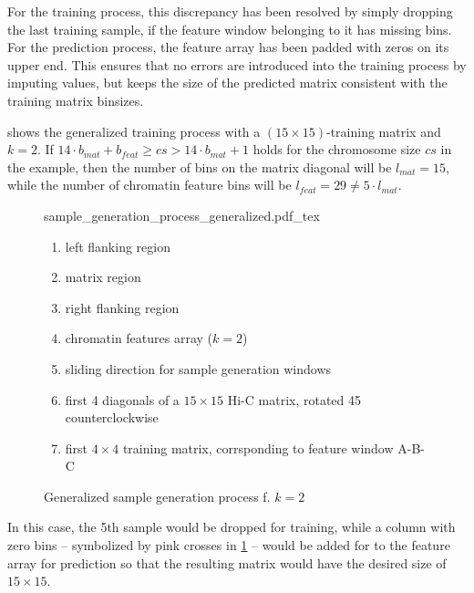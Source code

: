 For the training process, this discrepancy has been resolved by simply dropping the last training sample, 
if the feature window belonging to it has missing bins.
For the prediction process, the feature array has been padded with zeros on its upper end.
This ensures that no errors are introduced into the training process by imputing values,
but keeps the size of the predicted matrix consistent with the training
matrix binsizes.

 shows the generalized training process with a $(15\times15)$-training matrix and $k=2$. 
If $14\cdot b_{mat} + b_{feat} \geq cs > 14\cdot b_{mat} + 1$ holds for the chromosome size $cs$ in the example,
then the number of bins on the matrix diagonal will be $l_{mat}=15$, while the number of chromatin feature bins will be $l_{feat}=29 \not = 5 \cdot l_{mat}$.
\begin{figure}
 \begin{minipage}{0.60\textwidth}
   \centering
    \small
    {sample_generation_process_generalized.pdf_tex}
    \caption{Generalized sample generation process f. $k=2$}
    \label{fig:methods:sample_gen_generalized}
 \end{minipage}\hfill
 \begin{minipage}{0.3\textwidth}
 \scriptsize
  \begin{enumerate}[label=\Alph*:,leftmargin=*]
   \raggedright
    \item left flanking region
    \item matrix region
    \item right flanking region
    \item chromatin features array ($k=2$)
    \item sliding direction for sample generation windows
    \item first 4 diagonals of a $15\times15$ Hi-C matrix, rotated \SI{45}{\deg} counterclockwise
    \item first $4\times4$ training matrix, corrsponding to feature window A-B-C
\end{enumerate}
 \end{minipage}
\end{figure}
In this case, the 5th sample would be dropped for training,
while a column with zero bins -- symbolized by pink crosses in \cref{fig:methods:sample_gen_generalized} -- would be added for to the feature array for prediction
so that the resulting matrix would have the desired size of $15 \times 15$.


